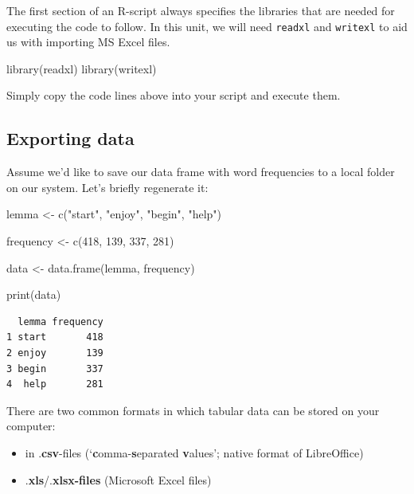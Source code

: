 \documentclass[
  11pt,
  letterpaper,
  DIV=11,
  numbers=noendperiod]{scrreprt}
\newenvironment{Shaded}{\begin{snugshade}}{\end{snugshade}}
\newcommand{\DecValTok}[1]{\textcolor[rgb]{0.68,0.00,0.00}{#1}}
\newcommand{\FunctionTok}[1]{\textcolor[rgb]{0.28,0.35,0.67}{#1}}
\newcommand{\NormalTok}[1]{\textcolor[rgb]{0.00,0.23,0.31}{#1}}
\newcommand{\OtherTok}[1]{\textcolor[rgb]{0.00,0.23,0.31}{#1}}
\newcommand{\StringTok}[1]{\textcolor[rgb]{0.13,0.47,0.30}{#1}}
\begin{document}
The first section of an R-script always specifies the libraries that are
needed for executing the code to follow. In this unit, we will need
\texttt{readxl} and \texttt{writexl} to aid us with importing MS Excel
files.

\begin{Shaded}
\begin{Highlighting}[]
\FunctionTok{library}\NormalTok{(readxl)}
\FunctionTok{library}\NormalTok{(writexl)}
\end{Highlighting}
\end{Shaded}

Simply copy the code lines above into your script and execute them.

\subsection{Exporting data}\label{exporting-data}

Assume we'd like to save our data frame with word frequencies to a local
folder on our system. Let's briefly regenerate it:

\begin{Shaded}
\begin{Highlighting}[]
\NormalTok{lemma }\OtherTok{\textless{}{-}} \FunctionTok{c}\NormalTok{(}\StringTok{"start"}\NormalTok{, }\StringTok{"enjoy"}\NormalTok{, }\StringTok{"begin"}\NormalTok{, }\StringTok{"help"}\NormalTok{)}

\NormalTok{frequency }\OtherTok{\textless{}{-}} \FunctionTok{c}\NormalTok{(}\DecValTok{418}\NormalTok{, }\DecValTok{139}\NormalTok{, }\DecValTok{337}\NormalTok{, }\DecValTok{281}\NormalTok{)}

\NormalTok{data }\OtherTok{\textless{}{-}} \FunctionTok{data.frame}\NormalTok{(lemma, frequency)}

\FunctionTok{print}\NormalTok{(data)}
\end{Highlighting}
\end{Shaded}

\begin{verbatim}
  lemma frequency
1 start       418
2 enjoy       139
3 begin       337
4  help       281
\end{verbatim}

There are two common formats in which tabular data can be stored on your
computer:

\begin{itemize}
\item
  in .\textbf{csv}-files (`\textbf{c}omma-\textbf{s}eparated
  \textbf{v}alues'; native format of LibreOffice)
\item
  .\textbf{xls}/.\textbf{xlsx-files} (Microsoft Excel files)
\end{itemize}
\end{document}
